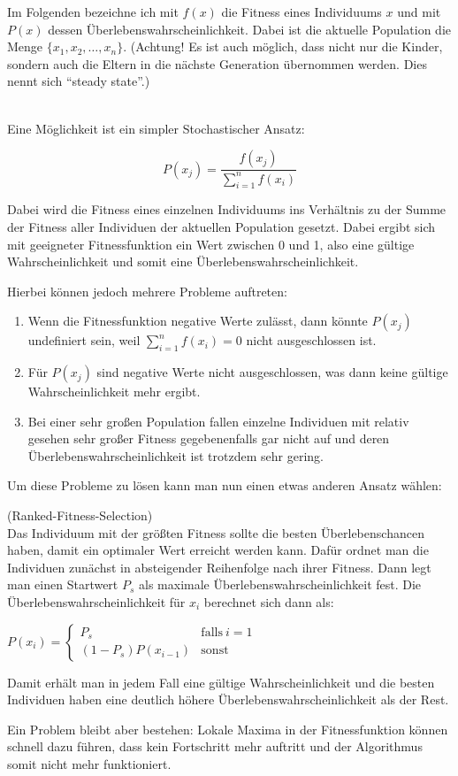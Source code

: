 Im Folgenden bezeichne ich mit $f(x)$ die Fitness eines Individuums $x$ und mit $P(x)$ dessen Überlebenswahrscheinlichkeit. Dabei ist die aktuelle Population die Menge $\{x_1,x_2,\dots,x_n\}$. (Achtung! Es ist auch möglich, dass nicht nur die Kinder, sondern auch die Eltern in die nächste Generation übernommen werden. Dies nennt sich "`steady state"'.)
\setcounter{algo}{0}
\begin{algo}\ \\
	Eine Möglichkeit ist ein simpler Stochastischer Ansatz:
	
	$$P(x_j)=\frac{f(x_j)}{\sum_{i=1}^{n}f(x_i)}$$
	
	Dabei wird die Fitness eines einzelnen Individuums ins Verhältnis zu der Summe der Fitness aller Individuen der aktuellen Population gesetzt. Dabei ergibt sich mit geeigneter Fitnessfunktion ein Wert zwischen 0 und 1, also eine gültige Wahrscheinlichkeit und somit eine Überlebenswahrscheinlichkeit.
	
	Hierbei können jedoch mehrere Probleme auftreten:
	
	\begin{enumerate}
		\item Wenn die Fitnessfunktion negative Werte zulässt, dann könnte $P(x_j)$ undefiniert sein, weil $\sum_{i=1}^{n}f(x_i)=0$ nicht ausgeschlossen ist.
		\item Für $P(x_j)$ sind negative Werte nicht ausgeschlossen, was dann keine gültige Wahrscheinlichkeit mehr ergibt.
		\item Bei einer sehr großen Population fallen einzelne Individuen mit relativ gesehen sehr großer Fitness gegebenenfalls gar nicht auf und deren Überlebenswahrscheinlichkeit ist trotzdem sehr gering.
	\end{enumerate}
\end{algo}
Um diese Probleme zu lösen kann man nun einen etwas anderen Ansatz wählen:
\begin{algo}(Ranked-Fitness-Selection)\\
	Das Individuum mit der größten Fitness sollte die besten Überlebenschancen haben, damit ein optimaler Wert erreicht werden kann. Dafür ordnet man die Individuen zunächst in absteigender Reihenfolge nach ihrer Fitness. Dann legt man einen Startwert $P_s$ als maximale Überlebenswahrscheinlichkeit fest. Die Überlebenswahrscheinlichkeit für $x_i$ berechnet sich dann als:
	
	\begin{center}
	$P(x_i)=\begin{cases}
	P_s & \mathrm{falls~} i=1\\
	(1-P_s)P(x_{i-1}) & \mathrm{sonst}
	\end{cases}$
	\end{center}
	
	Damit erhält man in jedem Fall eine gültige Wahrscheinlichkeit und die besten Individuen haben eine deutlich höhere Überlebenswahrscheinlichkeit als der Rest.
	
	Ein Problem bleibt aber bestehen:
	Lokale Maxima in der Fitnessfunktion können schnell dazu führen, dass kein Fortschritt mehr auftritt und der Algorithmus somit nicht mehr funktioniert.
\end{algo}
